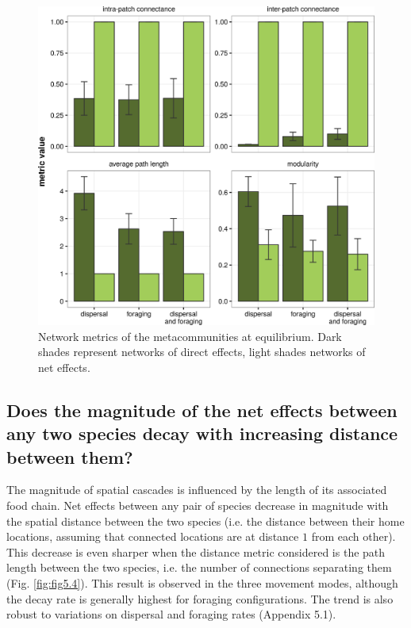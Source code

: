 \begin{figure}[ht]
\includegraphics[width=.9\textwidth,height=\textheight,keepaspectratio]{./Figures/chapter05/Fig_3.png}
\centering
\caption[Metacommunity network metrics]{\color{Gray}Network metrics of the metacommunities at equilibrium. Dark shades represent networks of direct effects, light shades networks of net effects.}\label{fig:fig5.3}
\end{figure}

\FloatBarrier

\subsection*{Does the magnitude of the net effects between any two species decay with increasing distance between them?}

The magnitude of spatial cascades is influenced by the length of its associated food chain. Net effects between any pair of species decrease in magnitude with the spatial distance between the two species (i.e. the distance between their home locations, assuming that connected locations are at distance $1$ from each other). This decrease is even sharper when the distance metric considered is the path length between the two species, i.e. the number of connections separating them (Fig. \ref{fig:fig5.4}). This result is observed in the three movement modes, although the decay rate is generally highest for foraging configurations. The trend is also robust to variations on dispersal and foraging rates (Appendix 5.1).

